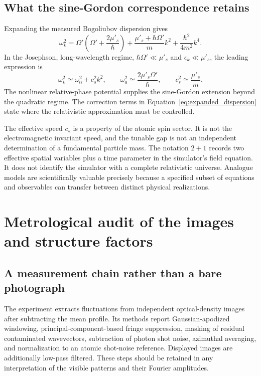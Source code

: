 \documentclass[11pt,a4paper]{article}
\theoremstyle{definition}
\theoremstyle{remark}
\newcommand{\musp}{\mu'_s}
\begin{document}
\subsection{What the sine-Gordon correspondence retains}
Expanding the measured Bogoliubov dispersion gives
\begin{equation}
 \omega_k^2
 =\Omega'\!\left(\Omega'+\frac{2\musp}{\hbar}\right)
 +\frac{\musp+\hbar\Omega'}{m}k^2
 +\frac{\hbar^2}{4m^2}k^4.
 \label{eq:expanded_dispersion}
\end{equation}
In the Josephson, long-wavelength regime, $\hbar\Omega'\ll\musp$ and $\epsilon_k\ll\musp$, the leading expression is
\begin{equation}
 \omega_k^2\simeq\omega_0^2+c_s^2k^2,
 \qquad \omega_0^2\simeq\frac{2\musp\Omega'}{\hbar},
 \qquad c_s^2\simeq\frac{\musp}{m}.
 \label{eq:relativistic}
\end{equation}
The nonlinear relative-phase potential supplies the sine-Gordon extension beyond the quadratic regime. The correction terms in Equation~\eqref{eq:expanded_dispersion} state where the relativistic approximation must be controlled.\cite{zhang2026,precursor,son}

The effective speed $c_s$ is a property of the atomic spin sector. It is not the electromagnetic invariant speed, and the tunable gap is not an independent determination of a fundamental particle mass. The notation $2+1$ records two effective spatial variables plus a time parameter in the simulator's field equation. It does not identify the simulator with a complete relativistic universe. Analogue models are scientifically valuable precisely because a specified subset of equations and observables can transfer between distinct physical realizations.\cite{analogue}

\section{Metrological audit of the images and structure factors}
\label{sec:metrology}
\subsection{A measurement chain rather than a bare photograph}
The experiment extracts fluctuations from independent optical-density images after subtracting the mean profile. Its methods report Gaussian-apodized windowing, principal-component-based fringe suppression, masking of residual contaminated wavevectors, subtraction of photon shot noise, azimuthal averaging, and normalization to an atomic shot-noise reference. Displayed images are additionally low-pass filtered. These steps should be retained in any interpretation of the visible patterns and their Fourier amplitudes.\cite{zhang2026}
\end{document}
